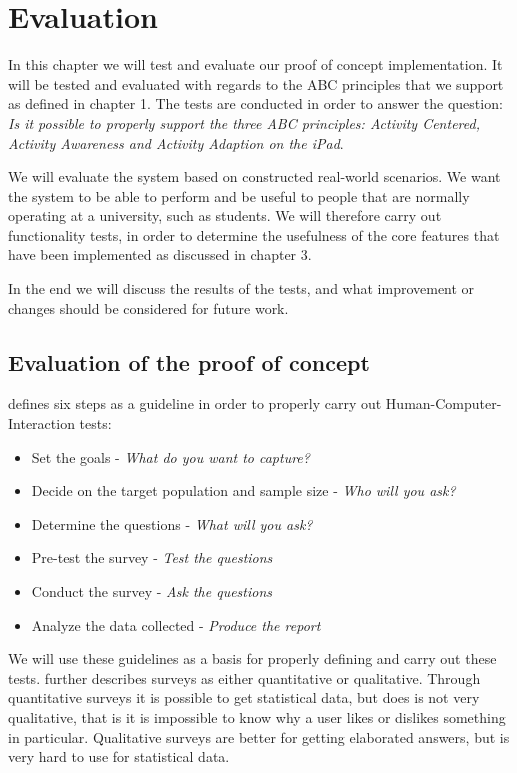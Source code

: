 \chapter{Evaluation}
In this chapter we will test and evaluate our proof of concept implementation. It will be tested and evaluated with regards to the ABC principles that we support as defined in chapter 1. The tests are conducted in order to answer the question: \emph{Is it possible to properly support the three ABC principles: Activity Centered, Activity Awareness and Activity Adaption on the iPad}.

We will evaluate the system based on constructed real-world scenarios. We want the system to be able to perform and be useful to people that are normally operating at a university, such as students. We will therefore carry out functionality tests, in order to determine the usefulness of the core features that have been implemented as discussed in chapter 3.

In the end we will discuss the results of the tests, and what improvement or changes should be considered for future work.

\section{Evaluation of the proof of concept}
\label{sec:evalutationPOC}

\citet{ugur2001} defines six steps as a guideline in order to properly carry out Human-Computer-Interaction tests:

\begin{itemize}
  \item Set the goals - \emph{What do you want to capture?}
  \item Decide on the target population and sample size - \emph{Who will you ask?}
  \item Determine the questions - \emph{What will you ask?}
  \item Pre-test the survey - \emph{Test the questions}
  \item Conduct the survey - \emph{Ask the questions}
  \item Analyze the data collected - \emph{Produce the report}
\end{itemize}

We will use these guidelines as a basis for properly defining and carry out these tests. \citet{ugur2001} further describes surveys as either quantitative or qualitative. Through quantitative surveys it is possible to get statistical data, but does is not very qualitative, that is it is impossible to know why a user likes or dislikes something in particular. Qualitative surveys are better for getting elaborated answers, but is very hard to use for statistical data.

